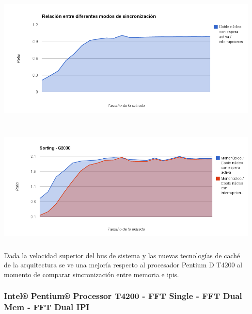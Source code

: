 \begin{center}
	    \includegraphics[height=7cm]{images/memory_ipis_g2030_sortipi.png}
	\end{center}


\begin{center}
	    \includegraphics[height=6cm]{images/sort_ipis_g2030.png}
	\end{center}


Dada la velocidad superior del bus de sistema y las nuevas tecnologías de caché de la arquitectura se ve una mejoría respecto al procesador Pentium D T4200 al momento de comparar sincronización entre memoria e ipis. 

\subsubsection{Intel® Pentium® Processor T4200 - FFT Single - FFT Dual Mem - FFT Dual IPI}

